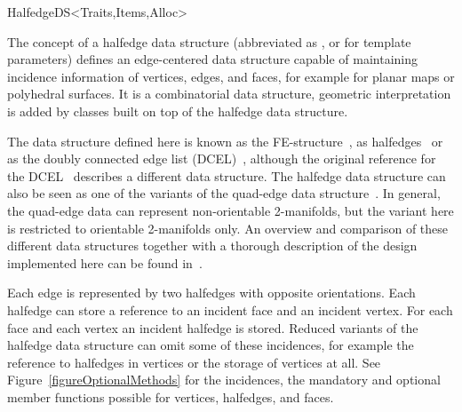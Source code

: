 
\ccRefPageBegin



\begin{ccRefConcept}{HalfedgeDS<Traits,Items,Alloc>}

\ccTagFullDeclarations

\ccDefinition
  
The concept of a halfedge data structure (abbreviated as , or
 for template parameters) defines an edge-centered data structure
capable of maintaining incidence information of vertices, edges, and
faces, for example for planar maps or polyhedral surfaces. It is a
combinatorial data structure, geometric interpretation is added by
classes built on top of the halfedge data structure.

The data structure defined here is known as the
FE-structure~\cite{w-ebdss-85}, as
halfedges~\cite{m-ism-88,cgal:bfh-mgedm-95} or as the doubly connected edge
list (DCEL)~\cite{bkos-cgaa-97}, although the original reference for
the DCEL~\cite{mp-fitcp-78} describes a different data structure. The
halfedge data structure can also be seen as one of the variants of the
quad-edge data structure~\cite{gs-pmgsc-85}. In general, the quad-edge
data can represent non-orientable 2-manifolds, but the variant here is
restricted to orientable 2-manifolds only. An overview and comparison
of these different data structures together with a thorough
description of the design implemented here can be found
in~\cite{k-ugpdd-99}.

Each edge is represented by two halfedges with opposite orientations.
Each halfedge can store a reference to an incident face and an
incident vertex.  For each face and each vertex an incident halfedge
is stored.  Reduced variants of the halfedge data structure can omit
some of these incidences, for example the reference to halfedges in
vertices or the storage of vertices at all. See 
Figure~\ref{figureOptionalMethods}
for the incidences, the mandatory and optional member functions
possible for vertices, halfedges, and faces.


\end{ccRefConcept}
